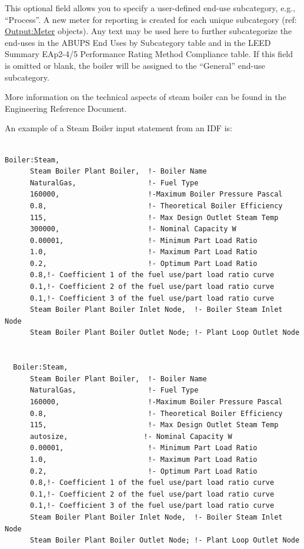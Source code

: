 This optional field allows you to specify a user-defined end-use subcategory, e.g., ``Process''. A new meter for reporting is created for each unique subcategory (ref: \hyperref[outputmeter-and-outputmetermeterfileonly]{Output:Meter} objects). Any text may be used here to further subcategorize the end-uses in the ABUPS End Uses by Subcategory table and in the LEED Summary EAp2-4/5 Performance Rating Method Compliance table. If this field is omitted or blank, the boiler will be assigned to the ``General'' end-use subcategory.


More information on the technical aspects of steam boiler can be found in the Engineering Reference Document.

An example of a Steam Boiler input statement from an IDF is:

\begin{lstlisting}

Boiler:Steam,
      Steam Boiler Plant Boiler,  !- Boiler Name
      NaturalGas,                 !- Fuel Type
      160000,                     !-Maximum Boiler Pressure Pascal
      0.8,                        !- Theoretical Boiler Efficiency
      115,                        !- Max Design Outlet Steam Temp
      300000,                     !- Nominal Capacity W
      0.00001,                    !- Minimum Part Load Ratio
      1.0,                        !- Maximum Part Load Ratio
      0.2,                        !- Optimum Part Load Ratio
      0.8,!- Coefficient 1 of the fuel use/part load ratio curve
      0.1,!- Coefficient 2 of the fuel use/part load ratio curve
      0.1,!- Coefficient 3 of the fuel use/part load ratio curve
      Steam Boiler Plant Boiler Inlet Node,  !- Boiler Steam Inlet Node
      Steam Boiler Plant Boiler Outlet Node; !- Plant Loop Outlet Node


  Boiler:Steam,
      Steam Boiler Plant Boiler,  !- Boiler Name
      NaturalGas,                 !- Fuel Type
      160000,                     !-Maximum Boiler Pressure Pascal
      0.8,                        !- Theoretical Boiler Efficiency
      115,                        !- Max Design Outlet Steam Temp
      autosize,                  !- Nominal Capacity W
      0.00001,                    !- Minimum Part Load Ratio
      1.0,                        !- Maximum Part Load Ratio
      0.2,                        !- Optimum Part Load Ratio
      0.8,!- Coefficient 1 of the fuel use/part load ratio curve
      0.1,!- Coefficient 2 of the fuel use/part load ratio curve
      0.1,!- Coefficient 3 of the fuel use/part load ratio curve
      Steam Boiler Plant Boiler Inlet Node,  !- Boiler Steam Inlet Node
      Steam Boiler Plant Boiler Outlet Node; !- Plant Loop Outlet Node
\end{lstlisting}

